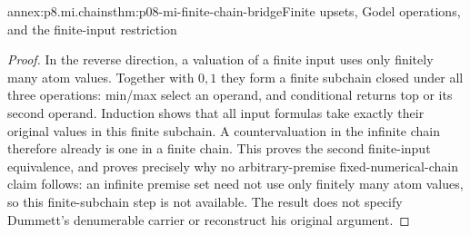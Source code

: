 \begin{annexitem}{annex:p8.mi.chains}{thm:p08-mi-finite-chain-bridge}{Finite upsets, Godel operations, and the finite-input restriction}
\begin{proof}
In the reverse direction, a valuation of a finite input uses only
finitely many atom values. Together with \(0,1\) they form a finite
subchain closed under all three operations: min/max select an operand,
and conditional returns top or its second operand. Induction shows
that all input formulas take exactly their original values in this
finite subchain. A countervaluation in the infinite chain therefore
already is one in a finite chain. This proves the second finite-input
equivalence, and proves precisely why no arbitrary-premise
fixed-numerical-chain claim follows: an infinite premise set need not
use only finitely many atom values, so this finite-subchain step is
not available. The result does not specify Dummett's denumerable
carrier or reconstruct his original argument.
\end{proof}
\end{annexitem}
